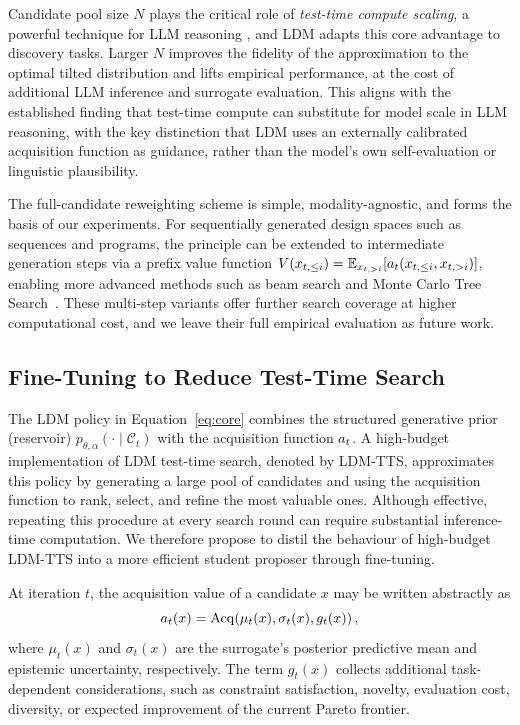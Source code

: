 Candidate pool size $N$ plays the critical role of \emph{test-time compute scaling}, a powerful technique for LLM reasoning \citep{wangTutorialLLMReasoning2025}, and LDM adapts this core advantage to discovery tasks. Larger $N$ improves the fidelity of the approximation to the optimal tilted distribution and lifts empirical performance, at the cost of additional LLM inference and surrogate evaluation. This aligns with the established finding that test-time compute can substitute for model scale in LLM reasoning, with the key distinction that LDM uses an externally calibrated acquisition function as guidance, rather than the model’s own self-evaluation or linguistic plausibility.

The full-candidate reweighting scheme is simple, modality-agnostic, and forms the basis of our experiments. For sequentially generated design spaces such as sequences and programs, the principle can be extended to intermediate generation steps via a prefix value function $V(x_{t,\le i}) = \mathbb{E}_{x_{t,>i}}[a_t(x_{t,\le i},x_{t,>i})]$, enabling more advanced methods such as beam search and Monte Carlo Tree Search~\citep{fengAlphazerolikeTreeSearchCan2024}. These multi-step variants offer further search coverage at higher computational cost, and we leave their full empirical evaluation as future work.




\subsection{Fine-Tuning to Reduce Test-Time Search}
\label{sec:ldm-finetune}

The LDM policy in Equation~\eqref{eq:core} combines the structured generative
prior (reservoir)
$p_{\theta,\alpha}(\cdot\mid\mathcal{C}_t)$
with the acquisition function $a_t$. A high-budget implementation of LDM
test-time search, denoted by LDM-TTS, approximates this policy by generating a
large pool of candidates and using the acquisition function to rank, select,
and refine the most valuable ones. Although effective, repeating this
procedure at every search round can require substantial inference-time
computation. We therefore propose to distil the behaviour of high-budget
LDM-TTS into a more efficient student proposer through fine-tuning.

At iteration $t$, the acquisition value of a candidate $x$ may be written
abstractly as
\begin{equation}
\label{eq:sft-acquisition}
    a_t(x)
    =
    \operatorname{Acq}\!\left(
        \mu_t(x),
        \sigma_t(x),
        g_t(x)
    \right),
\end{equation}
where $\mu_t(x)$ and $\sigma_t(x)$ are the surrogate's posterior predictive
mean and epistemic uncertainty, respectively. The term $g_t(x)$ collects
additional task-dependent considerations, such as constraint satisfaction,
novelty, evaluation cost, diversity, or expected improvement of the current
Pareto frontier.

